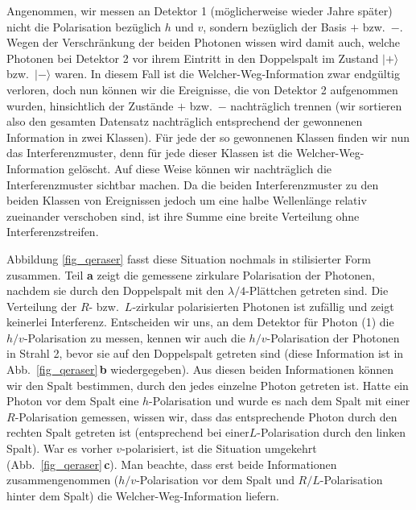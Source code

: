  Angenommen, wir messen an Detektor 1 (m\"oglicherweise wieder
 \glqq Jahre sp\"ater\grqq) nicht die Polarisation bez\"uglich 
 $h$ und $v$, sondern bez\"uglich der Basis $+$ bzw.\ $-$.
 Wegen der Verschr\"ankung der beiden Photonen wissen
 wird damit auch, welche Photonen bei Detektor 2
vor ihrem Eintritt in den Doppelspalt
 im Zustand $|+\rangle$ bzw.\ $|-\rangle$ waren. In diesem
 Fall ist die \glq Welcher-Weg\grq-Information zwar endg\"ultig
 verloren, doch nun k\"onnen wir die Ereignisse, die von
 Detektor 2 aufgenommen wurden, hinsichtlich der Zust\"ande
 $+$ bzw.\ $-$ nachtr\"aglich trennen (wir sortieren also den
 gesamten Datensatz nachtr\"aglich entsprechend der
 gewonnenen Information in zwei Klassen). F\"ur jede der
 so gewonnenen Klassen finden wir nun das Inter\-ferenz\-mus\-ter,
 denn f\"ur jede dieser Klassen ist die 
 \glq Welcher-Weg\grq-Information
 gel\"oscht. Auf diese Weise k\"onnen wir nachtr\"aglich
 die Interferenzmuster sichtbar machen. Da die beiden
 Interferenzmuster zu den beiden Klassen von Ereignissen
 jedoch um eine halbe Wellenl\"ange relativ zueinander
 verschoben sind, ist ihre Summe eine breite Verteilung
 ohne Interferenzstreifen. 
 
Abbildung \ref{fig_qeraser} fasst diese Situation
nochmals in stilisierter Form zusammen. Teil \textbf{a} 
zeigt die gemessene zirkulare Polarisation 
der Photonen, nachdem sie durch den Doppelspalt
mit den $\lambda/4$-Pl\"attchen getreten sind.
Die Verteilung der $R$- bzw.\ $L$-zirkular polarisierten
Photonen ist zuf\"allig und zeigt keinerlei Interferenz.
Entscheiden wir uns, an dem Detektor f\"ur Photon
(1) die $h/v$-Polarisation zu messen, kennen wir
auch die $h/v$-Polarisation der Photonen in Strahl 2, 
bevor sie auf den Doppelspalt getreten sind (diese Information
ist in Abb.\
\ref{fig_qeraser}\,\textbf{b} wiedergegeben). 
Aus diesen beiden Informationen
k\"onnen wir den Spalt bestimmen, durch den
jedes einzelne Photon getreten ist. Hatte ein Photon
vor dem Spalt eine $h$-Polarisation und wurde es
nach dem Spalt mit einer $R$-Polarisation
gemessen, wissen wir, dass das entsprechende
Photon durch den rechten Spalt
getreten ist (entsprechend bei einer$L$-Polarisation
durch den linken Spalt). War es vorher $v$-polarisiert,
ist die Situation umgekehrt (Abb.\ \ref{fig_qeraser}\,\textbf{c}). 
Man beachte, dass erst beide Informationen
zusammengenommen ($h/v$-Polarisation vor dem Spalt
und $R/L$-Polarisation hinter dem Spalt) die
\glq Welcher-Weg\grq-Information liefern. 

